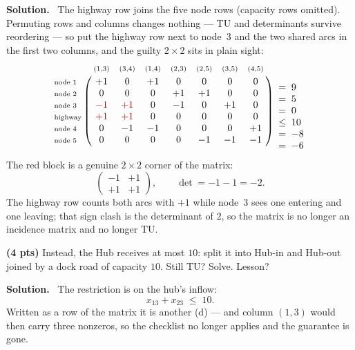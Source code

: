 \documentclass[10pt]{article}
\newenvironment{solution}
  {\par\smallskip\begingroup\color{solink}\textbf{Solution.}\ }
  {\endgroup\par}
\begin{document}
\begin{parts}
\begin{solution}
The highway row joins the five node rows (capacity rows omitted). Permuting rows and columns
changes nothing --- TU and determinants survive reordering --- so put the highway row next to
node~3 and the two shared arcs in the first two columns, and the guilty $2 \times 2$ sits in
plain sight:
\[
\bordermatrix{%
  & \scriptstyle (1,3) & \scriptstyle (3,4) & \scriptstyle (1,4) & \scriptstyle (2,3)
  & \scriptstyle (2,5) & \scriptstyle (3,5) & \scriptstyle (4,5) \cr
 \scriptstyle \text{node }1 & +1 &  0 & +1 &  0 &  0 &  0 &  0 \cr
 \scriptstyle \text{node }2 &  0 &  0 &  0 & +1 & +1 &  0 &  0 \cr
 \scriptstyle \text{node }3 & {\color{red!75!black}-1} & {\color{red!75!black}+1}
   &  0 & -1 &  0 & +1 &  0 \cr
 \scriptstyle \text{highway} & {\color{red!75!black}+1} & {\color{red!75!black}+1}
   &  0 &  0 &  0 &  0 &  0 \cr
 \scriptstyle \text{node }4 &  0 & -1 & -1 &  0 &  0 &  0 & +1 \cr
 \scriptstyle \text{node }5 &  0 &  0 &  0 &  0 & -1 & -1 & -1 \cr}
\begin{array}{l}
 \phantom{=\;0} \\
 =\;9 \\ =\;5 \\ =\;0 \\ \le\;10 \\ =\;-8 \\ =\;-6
\end{array}
\]
The red block is a genuine $2 \times 2$ corner of the matrix:
\[
  \begin{pmatrix} -1 & +1 \\ +1 & +1 \end{pmatrix},
  \qquad \det = -1 - 1 = -2 .
\]
The highway row counts both arcs with $+1$ while node~3 sees one entering and one leaving;
that sign clash is the determinant of $2$, so the matrix is no longer an incidence matrix
and no longer TU.
\end{solution}

\item \textbf{(4 pts)} Instead, the Hub receives at most $10$: split it into Hub-in and
  Hub-out joined by a dock road of capacity $10$. Still TU? Solve. Lesson?

\begin{solution}
The restriction is on the hub's inflow:
\[
  x_{13} + x_{23} \;\le\; 10 .
\]
Written as a row of the matrix it is another (d) --- and column $(1,3)$ would then carry
three nonzeros, so the checklist no longer applies and the guarantee is gone.


\end{solution}
\end{parts}
\end{document}
